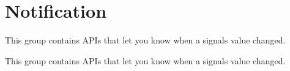 \hypertarget{group__notification__group}{}\section{Notification}
\label{group__notification__group}


This group contains A\+P\+Is that let you know when a signal\textquotesingle{}s value changed.  


This group contains A\+P\+Is that let you know when a signal\textquotesingle{}s value changed. 

